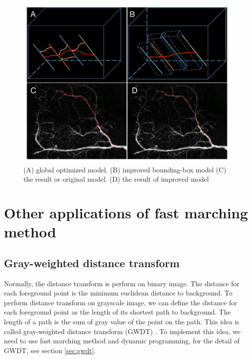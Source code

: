 \begin{figure}[htb]
\begin{center}
\includegraphics[width=5in]{images/fm_dynamic_compare}
\caption{(A) global optimized model. (B) improved bounding-box model (C) the result or original model. (D) the result of improved model}
\label{fig:fm-dynamic-compare}
\end{center}
\end{figure}
\section{Other applications of fast marching method}
\subsection{Gray-weighted distance transform}
Normally, the distance transform is perform on binary image. The distance for each foreground point is the minimum euclidean distance to background. To perform distance transform on grayscale image, we can define the distance for each foreground point as the length of its shortest path to background. The length of a path is the sum of gray value of the point on the path. This idea is called gray-weighted distance transform (GWDT) \cite{rutovitz1968data}. To implement this idea, we need to use fast marching method and dynamic programming, for the detail of GWDT, see section \ref{sec:gwdt}.

